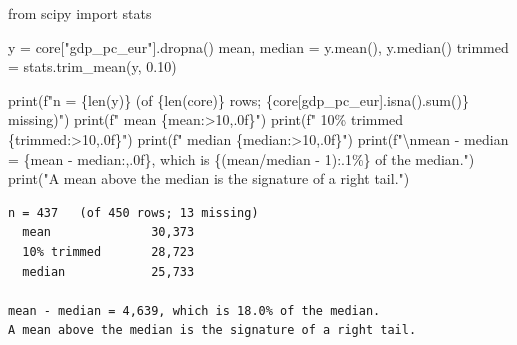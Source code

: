 \documentclass[
  letterpaper,
  10pt,
  twoside,
  openright,
  numbers=noenddot,
  chapterprefix=true]{scrbook}
\newenvironment{Shaded}{}{}
\newcommand{\BuiltInTok}[1]{\textcolor[rgb]{0.84,0.23,0.29}{#1}}
\newcommand{\CharTok}[1]{\textcolor[rgb]{0.01,0.18,0.38}{#1}}
\newcommand{\DecValTok}[1]{\textcolor[rgb]{0.00,0.36,0.77}{#1}}
\newcommand{\FloatTok}[1]{\textcolor[rgb]{0.00,0.36,0.77}{#1}}
\newcommand{\ImportTok}[1]{\textcolor[rgb]{0.01,0.18,0.38}{#1}}
\newcommand{\NormalTok}[1]{\textcolor[rgb]{0.14,0.16,0.18}{#1}}
\newcommand{\OperatorTok}[1]{\textcolor[rgb]{0.14,0.16,0.18}{#1}}
\newcommand{\SpecialCharTok}[1]{\textcolor[rgb]{0.00,0.36,0.77}{#1}}
\newcommand{\SpecialStringTok}[1]{\textcolor[rgb]{0.01,0.18,0.38}{#1}}
\newcommand{\StringTok}[1]{\textcolor[rgb]{0.01,0.18,0.38}{#1}}
\begin{document}
\label{check-centre}
\begin{Shaded}
\begin{Highlighting}[]
\ImportTok{from}\NormalTok{ scipy }\ImportTok{import}\NormalTok{ stats}

\NormalTok{y }\OperatorTok{=}\NormalTok{ core[}\StringTok{"gdp\_pc\_eur"}\NormalTok{].dropna()}
\NormalTok{mean, median }\OperatorTok{=}\NormalTok{ y.mean(), y.median()}
\NormalTok{trimmed }\OperatorTok{=}\NormalTok{ stats.trim\_mean(y, }\FloatTok{0.10}\NormalTok{)}

\BuiltInTok{print}\NormalTok{(}\SpecialStringTok{f"n = }\SpecialCharTok{\{}\BuiltInTok{len}\NormalTok{(y)}\SpecialCharTok{\}}\SpecialStringTok{   (of }\SpecialCharTok{\{}\BuiltInTok{len}\NormalTok{(core)}\SpecialCharTok{\}}\SpecialStringTok{ rows; }\SpecialCharTok{\{}\NormalTok{core[}\StringTok{\textquotesingle{}gdp\_pc\_eur\textquotesingle{}}\NormalTok{]}\SpecialCharTok{.}\NormalTok{isna()}\SpecialCharTok{.}\BuiltInTok{sum}\NormalTok{()}\SpecialCharTok{\}}\SpecialStringTok{ missing)"}\NormalTok{)}
\BuiltInTok{print}\NormalTok{(}\SpecialStringTok{f"  mean          }\SpecialCharTok{\{}\NormalTok{mean}\SpecialCharTok{:\textgreater{}10,.0f\}}\SpecialStringTok{"}\NormalTok{)}
\BuiltInTok{print}\NormalTok{(}\SpecialStringTok{f"  10\% trimmed   }\SpecialCharTok{\{}\NormalTok{trimmed}\SpecialCharTok{:\textgreater{}10,.0f\}}\SpecialStringTok{"}\NormalTok{)}
\BuiltInTok{print}\NormalTok{(}\SpecialStringTok{f"  median        }\SpecialCharTok{\{}\NormalTok{median}\SpecialCharTok{:\textgreater{}10,.0f\}}\SpecialStringTok{"}\NormalTok{)}
\BuiltInTok{print}\NormalTok{(}\SpecialStringTok{f"}\CharTok{\textbackslash{}n}\SpecialStringTok{mean {-} median = }\SpecialCharTok{\{}\NormalTok{mean }\OperatorTok{{-}}\NormalTok{ median}\SpecialCharTok{:,.0f\}}\SpecialStringTok{, which is }\SpecialCharTok{\{}\NormalTok{(mean}\OperatorTok{/}\NormalTok{median }\OperatorTok{{-}} \DecValTok{1}\NormalTok{)}\SpecialCharTok{:.1\%\}}\SpecialStringTok{ of the median."}\NormalTok{)}
\BuiltInTok{print}\NormalTok{(}\StringTok{"A mean above the median is the signature of a right tail."}\NormalTok{)}
\end{Highlighting}
\end{Shaded}

\begin{verbatim}
n = 437   (of 450 rows; 13 missing)
  mean              30,373
  10% trimmed       28,723
  median            25,733

mean - median = 4,639, which is 18.0% of the median.
A mean above the median is the signature of a right tail.
\end{verbatim}
\end{document}
